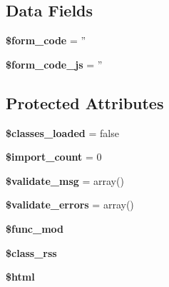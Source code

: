 \subsection*{Data Fields}
\begin{DoxyCompactItemize}
\item 
\hypertarget{classadmin__forums__rss__import_af28aee726fa3eb6c355d08a2ab655e03}{{\bfseries \$form\-\_\-code} = ''}\label{classadmin__forums__rss__import_af28aee726fa3eb6c355d08a2ab655e03}

\item 
\hypertarget{classadmin__forums__rss__import_ac68fe8a02a2efd63c3271179f4b4fbb7}{{\bfseries \$form\-\_\-code\-\_\-js} = ''}\label{classadmin__forums__rss__import_ac68fe8a02a2efd63c3271179f4b4fbb7}

\end{DoxyCompactItemize}
\subsection*{Protected Attributes}
\begin{DoxyCompactItemize}
\item 
\hypertarget{classadmin__forums__rss__import_ac7bf41975b92ceb157dc7f613395f61b}{{\bfseries \$classes\-\_\-loaded} = false}\label{classadmin__forums__rss__import_ac7bf41975b92ceb157dc7f613395f61b}

\item 
\hypertarget{classadmin__forums__rss__import_a2d74942b36edcffde3de3fd9fccf3d60}{{\bfseries \$import\-\_\-count} = 0}\label{classadmin__forums__rss__import_a2d74942b36edcffde3de3fd9fccf3d60}

\item 
\hypertarget{classadmin__forums__rss__import_aad01c60cf44b9754911daffe9eff51bf}{{\bfseries \$validate\-\_\-msg} = array()}\label{classadmin__forums__rss__import_aad01c60cf44b9754911daffe9eff51bf}

\item 
\hypertarget{classadmin__forums__rss__import_ac1d498eba1bc8fe0d47283671f332222}{{\bfseries \$validate\-\_\-errors} = array()}\label{classadmin__forums__rss__import_ac1d498eba1bc8fe0d47283671f332222}

\item 
\hypertarget{classadmin__forums__rss__import_ae37947155b556e0ec67663afdf3fdc1b}{{\bfseries \$func\-\_\-mod}}\label{classadmin__forums__rss__import_ae37947155b556e0ec67663afdf3fdc1b}

\item 
\hypertarget{classadmin__forums__rss__import_a1966eb4d6a80d0cb78563828a17ecc41}{{\bfseries \$class\-\_\-rss}}\label{classadmin__forums__rss__import_a1966eb4d6a80d0cb78563828a17ecc41}

\item 
\hypertarget{classadmin__forums__rss__import_a6f96e7fc92441776c9d1cd3386663b40}{{\bfseries \$html}}\label{classadmin__forums__rss__import_a6f96e7fc92441776c9d1cd3386663b40}

\end{DoxyCompactItemize}



